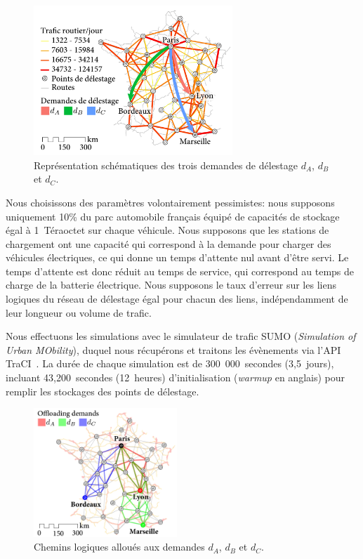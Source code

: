\begin{figure} 
    \centering 
    \includegraphics[width=7.5cm]{figures-fr/France-overlay-haulage-fr.pdf} 
    \caption{Représentation schématiques des trois demandes de délestage $d_A$, $d_B$ et $d_C$.} 
    \label{fig:france-demand-allocation-haulage-fr} 
\end{figure} 
Nous choisissons des paramètres volontairement pessimistes: nous supposons uniquement 10\% du parc automobile français équipé de capacités de stockage égal à 1~Téraoctet sur chaque véhicule. Nous supposons que les stations de chargement ont une capacité qui correspond à la demande pour charger des véhicules électriques, ce qui donne un temps d’attente nul avant d’être servi. Le temps d’attente est donc réduit au temps de service, qui correspond au temps de charge de la batterie électrique. Nous supposons le taux d’erreur sur les liens logiques du réseau de délestage égal pour chacun des liens, indépendamment de leur longueur ou volume de trafic. 
 
 
Nous effectuons les simulations avec le simulateur de trafic SUMO (\textit{Simulation of Urban MObility}), duquel nous récupérons et traitons les évènements via l’API TraCI~\cite{behrisch2011sumo}. La durée de chaque simulation est de 300~000~secondes (3,5~jours), incluant 43,200~secondes (12~heures) d’initialisation (\textit{warmup} en anglais) pour remplir les stockages des points de délestage. 
 
\begin{figure}
    \vspace{-15pt}
    \centering
    \includegraphics[width=5.4cm]{figures-fr/France-AADT-overlay-layers-fr.pdf}
    \caption{Chemins logiques alloués aux demandes $d_A$, $d_B$ et $d_C$.}
    \label{fig:allocation-subpaths-offloading-overlay-fr}
\end{figure}
